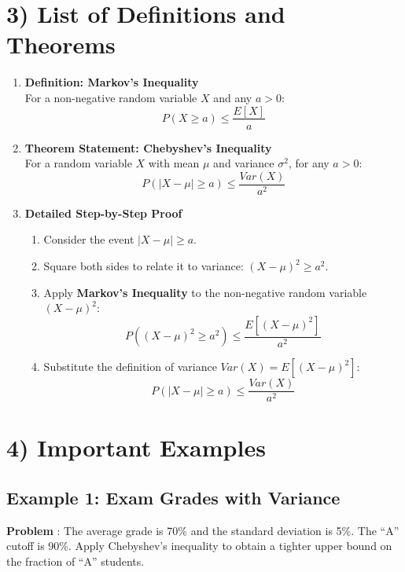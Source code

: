 \documentclass[11pt]{article}
\begin{document}
\section*{3) List of Definitions and Theorems} 
\begin{enumerate}
    \item \textbf{Definition: Markov’s Inequality} \\
    For a non-negative random variable $X$ and any $a > 0$:
    \[ P(X \ge a) \le \frac{E[X]}{a} \]

    \item \textbf{Theorem Statement: Chebyshev’s Inequality} \\
    For a random variable $X$ with mean $\mu$ and variance $\sigma^2$, for any $a > 0$:
    \[ P(|X - \mu| \ge a) \le \frac{Var(X)}{a^2} \]

    \item \textbf{Detailed Step-by-Step Proof}
    \begin{enumerate}
        \item[1.] Consider the event $|X - \mu| \ge a$.
        \item[2.] Square both sides to relate it to variance: $(X - \mu)^2 \ge a^2$.
        \item[3.] Apply \textbf{Markov’s Inequality} to the non-negative random variable $(X - \mu)^2$:
            \[ P((X - \mu)^2 \ge a^2) \le \frac{E[(X - \mu)^2]}{a^2} \]
        \item[4.] Substitute the definition of variance $Var(X) = E[(X - \mu)^2]$:
            \[ P(|X - \mu| \ge a) \le \frac{Var(X)}{a^2} \]
    \end{enumerate}
\end{enumerate}

\section*{4) Important Examples}

\subsection*{Example 1: Exam Grades with Variance} 
\vspace{0.1 cm}
\textbf{Problem} : The average grade is 70\% and the standard deviation is 5\%. The ``A'' cutoff is 90\%. Apply Chebyshev’s inequality to obtain a tighter upper bound on the fraction of ``A'' students.
\end{document}
